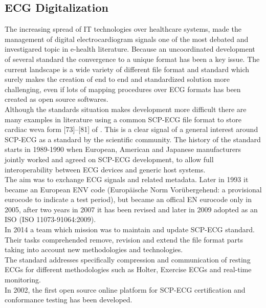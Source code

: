 \subsection{ECG Digitalization}
\label{subsection:ecgdigitaliation}
The increasing spread of IT technologies over healthcare systems, made the management of digital electrocardiogram signals one of the most debated and investigared topic in e-health literature. Because an uncoordinated development of several standard the convergence to a unique format has been a key issue. \cite{trigo} The current landscape is a wide variety of different file format and standard which surely makes the creation of end to end and standardized solution more challenging, even if lots of mapping procedures over ECG formats has been created as open source softwares.\\
Although the standards situation makes development more difficult there are many examples in literature using a common SCP-ECG file format to store cardiac weva form [73]–[81] of \cite{trigo}. This is a clear signal of a general interest around SCP-ECG as a standard by the scientific community. The history of the standard starts in 1989-1990 when European, American and Japanese manufacturers jointly worked and agreed on SCP-ECG development, to allow full interoperability between ECG devices and generic host systems.\\
The aim was to exchange ECG signals and related metadata.
Later in 1993 it became an European ENV code (Europäische Norm Vorübergehend: a provisional eurocode to indicate a test period), but became an offical EN eurocode only in 2005, after two years in 2007 it has been revised and later in 2009 adopted as an ISO (ISO 11073-91064:2009).\\
In 2014 a team which mission was to maintain and update SCP-ECG standard. Their tasks comprehended remove, revision and extend the file format parts taking into account new methodologies and technologies.\cite{danilopani}\\
The standard addresses specifically compression and communication of resting ECGs for different methodologies such as Holter, Exercise ECGs and real-time monitoring.\\
In 2002, the first open source online platform for SCP-ECG certification and conformance testing has been developed.\cite{Chronaki}\\

